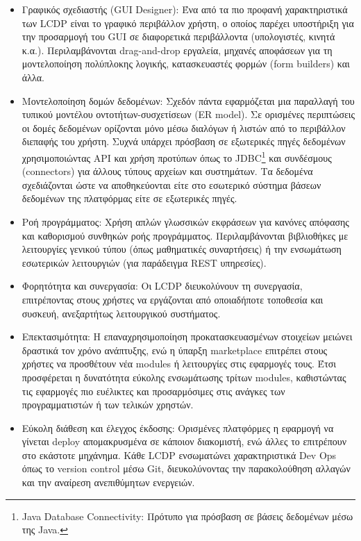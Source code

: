             \begin{itemize}[label={\tiny \blacksquare}]
                \setlength\itemsep{-0.25em}
                \item Γραφικός σχεδιαστής (GUI Designer): Ένα από τα πιο προφανή χαρακτηριστικά των LCDP είναι το γραφικό περιβάλλον χρήστη, ο οποίος παρέχει υποστήριξη για την προσαρμογή του GUI σε διαφορετικά περιβάλλοντα (υπολογιστές, κινητά κ.α.). Περιλαμβάνονται drag-and-drop εργαλεία, μηχανές αποφάσεων για τη μοντελοποίηση πολύπλοκης λογικής, κατασκευαστές φορμών (form builders) και άλλα.
                \item Μοντελοποίηση δομών δεδομένων: Σχεδόν πάντα εφαρμόζεται μια παραλλαγή του τυπικού μοντέλου οντοτήτων-συσχετίσεων (ER model). Σε ορισμένες περιπτώσεις οι δομές δεδομένων ορίζονται μόνο μέσω διαλόγων ή λιστών από το περιβάλλον διεπαφής του χρήστη. Συχνά υπάρχει πρόσβαση σε εξωτερικές πηγές δεδομένων χρησιμοποιώντας API και χρήση προτύπων όπως το JDBC\footnote{Java Database Connectivity: Πρότυπο για πρόσβαση σε βάσεις δεδομένων μέσω της Java.} και συνδέσμους (connectors) για άλλους τύπους αρχείων και συστημάτων. Τα δεδομένα σχεδιάζονται ώστε να αποθηκεύονται είτε στο εσωτερικό σύστημα βάσεων δεδομένων της πλατφόρμας είτε σε εξωτερικές πηγές.
                \item Ροή προγράμματος: Χρήση απλών γλωσσικών εκφράσεων για κανόνες απόφασης και καθορισμού συνθηκών ροής προγράμματος. Περιλαμβάνονται βιβλιοθήκες με λειτουργίες γενικού τύπου (όπως μαθηματικές συναρτήσεις) ή την ενσωμάτωση εσωτερικών λειτουργιών (για παράδειγμα REST υπηρεσίες).
                \item Φορητότητα και συνεργασία: Οι LCDP διευκολύνουν τη συνεργασία, επιτρέποντας στους χρήστες να εργάζονται από οποιαδήποτε τοποθεσία και συσκευή, ανεξαρτήτως λειτουργικού συστήματος.
                \item Επεκτασιμότητα: Η επαναχρησιμοποίηση προκατασκευασμένων στοιχείων μειώνει δραστικά τον χρόνο ανάπτυξης, ενώ η ύπαρξη marketplace επιτρέπει στους χρήστες να προσθέτουν νέα modules ή λειτουργίες στις εφαρμογές τους. Έτσι προσφέρεται η δυνατότητα εύκολης ενσωμάτωσης τρίτων modules, καθιστώντας τις εφαρμογές πιο ευέλικτες και προσαρμόσιμες στις ανάγκες των προγραμματιστών ή των τελικών χρηστών.
                \item Εύκολη διάθεση και έλεγχος έκδοσης: Ορισμένες πλατφόρμες η εφαρμογή να γίνεται deploy απομακρυσμένα σε κάποιον διακομιστή, ενώ άλλες το επιτρέπουν στο εκάστοτε μηχάνημα. Κάθε LCDP ενσωματώνει χαρακτηριστικά Dev Ops όπως το version control μέσω Git, διευκολύνοντας την παρακολούθηση αλλαγών και την αναίρεση ανεπιθύμητων ενεργειών. \cite{Bock2021}
            \end{itemize}

